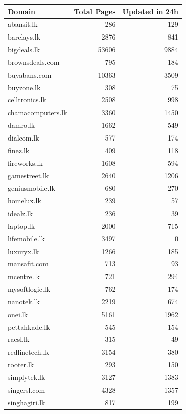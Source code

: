 \begin{table}[H]
    \centering
    \begin{tabular}{lrr}
        \toprule
        \textbf{Domain} & \textbf{Total Pages} & \textbf{Updated in 24h} \\
        \midrule
        abansit.lk & 286 & 129 \\
        barclays.lk & 2876 & 841 \\
        bigdeals.lk & 53606 & 9884 \\
        brownsdeals.com & 795 & 184 \\
        buyabans.com & 10363 & 3509 \\
        buyzone.lk & 308 & 75 \\
        celltronics.lk & 2508 & 998 \\
        chamacomputers.lk & 3360 & 1450 \\
        damro.lk & 1662 & 549 \\
        dialcom.lk & 577 & 174 \\
        finez.lk & 409 & 118 \\
        fireworks.lk & 1608 & 594 \\
        gamestreet.lk & 2640 & 1206 \\
        geniusmobile.lk & 680 & 270 \\
        homelux.lk & 239 & 57 \\
        idealz.lk & 236 & 39 \\
        laptop.lk & 2000 & 715 \\
        lifemobile.lk & 3497 & 0 \\
        luxuryx.lk & 1266 & 185 \\
        mansafit.com & 713 & 93 \\
        mcentre.lk & 721 & 294 \\
        mysoftlogic.lk & 762 & 174 \\
        nanotek.lk & 2219 & 674 \\
        onei.lk & 5161 & 1962 \\
        pettahkade.lk & 545 & 154 \\
        raesl.lk & 315 & 49 \\
        redlinetech.lk & 3154 & 380 \\
        rooter.lk & 293 & 150 \\
        simplytek.lk & 3127 & 1383 \\
        singersl.com & 4328 & 1357 \\
        singhagiri.lk & 817 & 199 \\

\end{tabular}
\end{table}
